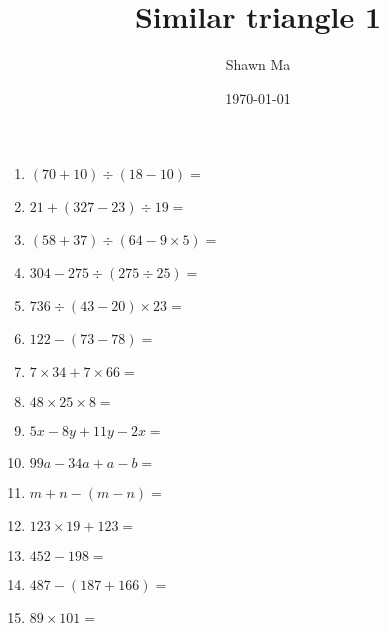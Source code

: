 \documentclass[letterpaper,12pt]{article}
\author{Shawn Ma}
\date{\today}
\title{Similar triangle 1}
\begin{document}
\setlength{\parindent}{0pt}

\begin{enumerate}
    \item $(70+10)\div(18-10)=$
    \item $21+(327-23)\div{19}=$
    \item $(58+37)\div(64-9\times{5})=$
    \item $304-275\div(275\div{25})=$
    \item $736\div(43-20)\times{23}=$
    \item $122-(73-78)=$
    \item $7\times{34}+7\times{66}=$
    \item $48\times{25}\times{8}=$
    \item $5x-8y+11y-2x=$
    \item $99a-34a+a-b=$
    \item $m+n-(m-n)=$
    \item $123\times{19}+123=$
    \item $452-198=$
    \item $487-(187+166)=$
    \item $89\times 101=$
\end{enumerate}
\end{document}
